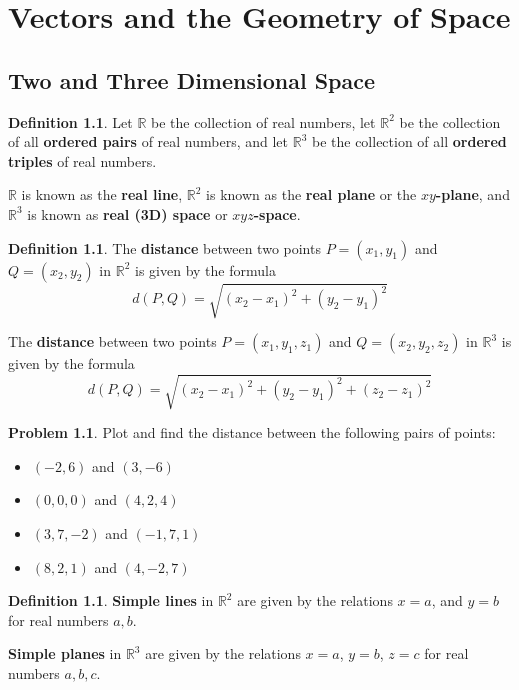 \documentclass[letterpaper, twoside, 12pt]{book}
\newcommand{\<}{\langle}
\renewcommand{\>}{\rangle}
\theoremstyle{definition}
\theoremstyle{definition}
\newtheorem{definition}[theorem]{Definition}
\newtheorem{problem}[theorem]{Problem}
\begin{document}
\renewcommand{\chaptername}{Packet}
\setcounter{chapter}{0}

\chapter{Vectors and the Geometry of Space}

\setcounter{chapter}{12}

\section{Two and Three Dimensional Space}

\begin{definition}
  Let $\mathbb{R}$ be the collection of real numbers, let $\mathbb{R}^2$ be the
  collection of all \textbf{ordered pairs} of real numbers, and let $\mathbb{R}^3$
  be the collection of all \textbf{ordered triples} of real numbers.

  $\mathbb{R}$ is known as the \textbf{real line}, $\mathbb{R}^2$ is known
  as the \textbf{real plane} or the \textbf{$xy$-plane}, and $\mathbb{R}^3$
  is known as \textbf{real (3D) space} or \textbf{$xyz$-space}.
\end{definition}

\begin{definition}
  The \textbf{distance} between two points $P=(x_1,y_1)$ and
  $Q=(x_2,y_2)$ in $\mathbb{R}^2$ is given by the formula
  \[
    d(P,Q) = \sqrt{(x_2-x_1)^2+(y_2-y_1)^2}
  \]

  The \textbf{distance} between two points $P=(x_1,y_1,z_1)$ and
  $Q=(x_2,y_2,z_2)$ in $\mathbb{R}^3$ is given by the formula
  \[
    d(P,Q) = \sqrt{(x_2-x_1)^2+(y_2-y_1)^2+(z_2-z_1)^2}
  \]
\end{definition}

\begin{problem}
  Plot and find the distance between the following pairs of points:
  \begin{itemize}
    \item $(-2,6)$ and $(3,-6)$
    \item $(0,0,0)$ and $(4,2,4)$
    \item $(3,7,-2)$ and $(-1,7,1)$
    \item $(8,2,1)$ and $(4,-2,7)$
  \end{itemize}
\end{problem}

\vfill

\newpage

\begin{definition}
  \textbf{Simple lines} in $\mathbb{R}^2$ are given by the relations $x=a$,
  and $y=b$ for real numbers $a,b$.

  \textbf{Simple planes} in $\mathbb{R}^3$ are given by the relations $x=a$,
  $y=b$, $z=c$ for real numbers $a,b,c$.
\end{definition}
\end{document}
